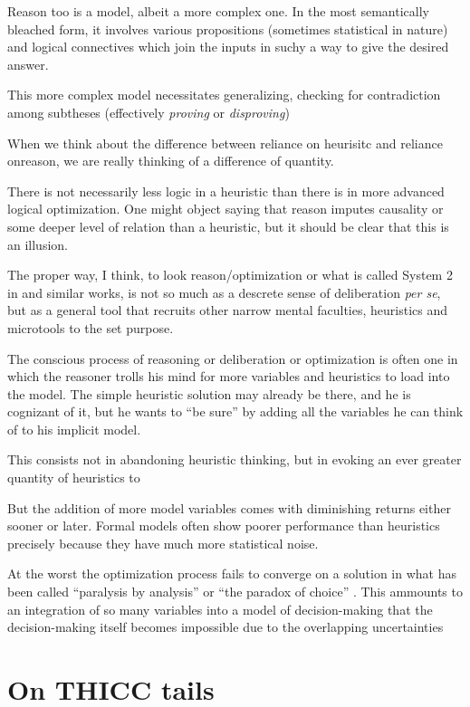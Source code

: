 \documentclass{article}
\begin{document}
Reason too is a model, albeit a more complex one.
In the most semantically bleached form, it involves various propositions (sometimes statistical in nature) and logical connectives which join the inputs in suchy a way to give the desired answer.

This more complex model necessitates generalizing, checking for contradiction among subtheses (effectively \textit{proving} or \textit{disproving})

When we think about the difference between reliance on heurisitc and reliance onreason, we are really thinking of a difference of quantity.

There is not necessarily less logic in a heuristic than there is in more advanced logical optimization.
One might object saying that reason imputes causality or some deeper level of relation than a heuristic, but it should be clear that this is an illusion.

The proper way, I think, to look reason/optimization or what is called System 2 in \textcite{kahneman11} and similar works, is not so much as a descrete sense of deliberation \emph{per se}, but as a general tool that recruits other narrow mental faculties, heuristics and microtools to the set purpose.

The conscious process of reasoning or deliberation or optimization is often one in which the reasoner trolls his mind for more variables and heuristics to load into the model.
The simple heuristic solution may already be there, and he is cognizant of it, but he wants to ``be sure'' by adding all the variables he can think of to his implicit model.

This consists not in abandoning heuristic thinking, but in evoking an ever greater quantity of heuristics to 

But the addition of more model variables comes with diminishing returns either sooner or later.
Formal models often show poorer performance than heuristics precisely because they have much more statistical noise.

At the worst the optimization process fails to converge on a solution in what has been called ``paralysis by analysis'' or ``the paradox of choice'' \parencite{schwartz04}.
This ammounts to an integration of so many variables into a model of decision-making that the decision-making itself becomes impossible due to the overlapping uncertainties


\section{On THICC tails\label{tails}}
\end{document}
